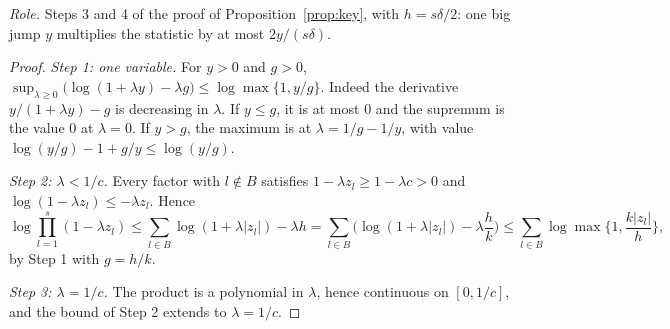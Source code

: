 \documentclass[11pt]{article}
\begin{document}
\emph{Role.} Steps 3 and 4 of the proof of Proposition~\ref{prop:key}, with $h=s\delta/2$: one big
jump $y$ multiplies the statistic by at most $2y/(s\delta)$.

\begin{proof}
\emph{Step 1: one variable.} For $y>0$ and $g>0$,
$\sup_{\lambda\ge0}\big(\log(1+\lambda y)-\lambda g\big)\le\log\max\{1,y/g\}$. Indeed the derivative
$y/(1+\lambda y)-g$ is decreasing in $\lambda$. If $y\le g$, it is at most $0$ and the supremum is
the value $0$ at $\lambda=0$. If $y>g$, the maximum is at $\lambda=1/g-1/y$, with value
$\log(y/g)-1+g/y\le\log(y/g)$.

\emph{Step 2: $\lambda<1/c$.} Every factor with $l\notin B$ satisfies $1-\lambda z_l\ge1-\lambda c>0$
and $\log(1-\lambda z_l)\le-\lambda z_l$. Hence
\[
  \log\prod_{l=1}^s(1-\lambda z_l)\le\sum_{l\in B}\log(1+\lambda|z_l|)-\lambda h
  =\sum_{l\in B}\Big(\log(1+\lambda|z_l|)-\lambda\frac hk\Big)\le\sum_{l\in B}\log\max\Big\{1,\frac{k|z_l|}{h}\Big\},
\]
by Step 1 with $g=h/k$.

\emph{Step 3: $\lambda=1/c$.} The product is a polynomial in $\lambda$, hence continuous on
$[0,1/c]$, and the bound of Step 2 extends to $\lambda=1/c$.
\end{proof}
\end{document}
